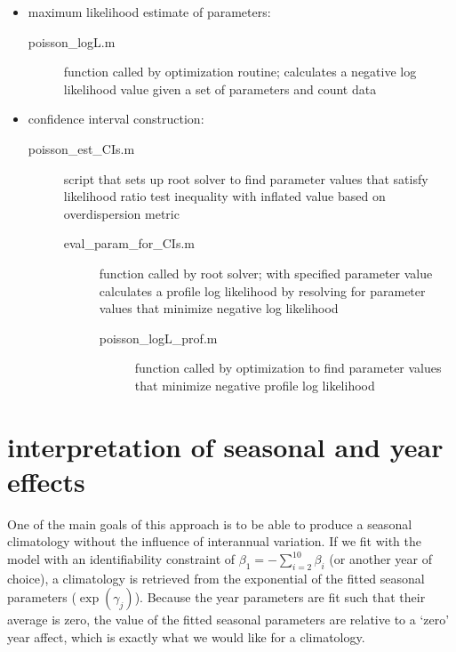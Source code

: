 \documentclass[11pt]{article}
\begin{document}

\begin{itemize}
\item maximum likelihood estimate of parameters:
\begin{description}
\item [poisson\_logL.m] function called by optimization routine; calculates a negative log likelihood value given a set of parameters and count data
\end{description}

\item confidence interval construction:
\begin{description}
\item [poisson\_est\_CIs.m] script that sets up root solver to find parameter values that satisfy likelihood ratio test inequality with inflated value based on overdispersion metric 
\begin{description}
\item [eval\_param\_for\_CIs.m] function called by root solver; with specified parameter value calculates a profile log likelihood by resolving for parameter values that minimize negative log likelihood
\begin{description}
\item [poisson\_logL\_prof.m] function called by optimization to find parameter values that minimize negative profile log likelihood
\end{description}
\end{description}
\end{description}
\end{itemize}


\section{interpretation of seasonal and year effects} 

One of the main goals of this approach is to be able to produce a seasonal climatology without the influence of interannual variation. If we fit with the model with an identifiability constraint of $\beta_1 = - \sum_{i=2}^{10}\beta_i$ (or another year of choice), a climatology is retrieved from the exponential of the fitted seasonal parameters ($\exp(\gamma_j)$).  Because the year parameters are fit such that their average is zero, the value of the fitted seasonal parameters are relative to a `zero' year affect, which is exactly what we would like for a climatology.  
\end{document}
